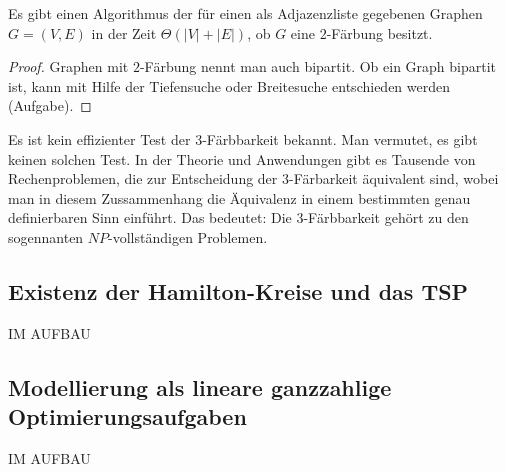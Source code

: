 \begin{prop}
		Es gibt einen Algorithmus der für einen als Adjazenzliste gegebenen Graphen $G=(V,E)$ in der Zeit $\Theta(|V|+|E|)$, ob $G$ eine $2$-Färbung besitzt. 
\end{prop} 
\begin{proof}
	Graphen mit $2$-Färbung nennt man auch bipartit. Ob ein Graph bipartit ist, kann mit Hilfe der Tiefensuche oder Breitesuche entschieden werden (Aufgabe). 
\end{proof} 

\begin{bem}
	Es ist kein effizienter Test der $3$-Färbbarkeit bekannt. Man vermutet, es gibt keinen solchen Test. 
	In der Theorie und Anwendungen gibt es Tausende von Rechenproblemen, die zur Entscheidung der $3$-Färbarkeit äquivalent sind, wobei man in diesem Zussammenhang die Äquivalenz in einem bestimmten genau definierbaren Sinn einführt. Das bedeutet: Die $3$-Färbbarkeit gehört zu den sogennanten $NP$-vollständigen Problemen. 
\end{bem} 

\subsection{Existenz der Hamilton-Kreise und das TSP}

IM AUFBAU 

\subsection{Modellierung als lineare ganzzahlige Optimierungsaufgaben}

IM AUFBAU
